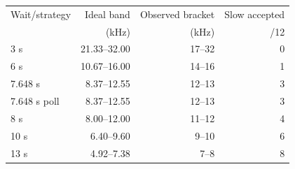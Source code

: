 \begin{tabular}{@{}lrrr@{}}
\toprule
Wait/strategy & Ideal band & Observed bracket & Slow accepted\\
 & (kHz) & (kHz) & /12\\
\midrule
3 s & 21.33--32.00 & 17--32 & 0 \\
6 s & 10.67--16.00 & 14--16 & 1 \\
7.648 s & 8.37--12.55 & 12--13 & 3 \\
7.648 s poll & 8.37--12.55 & 12--13 & 3 \\
8 s & 8.00--12.00 & 11--12 & 4 \\
10 s & 6.40--9.60 & 9--10 & 6 \\
13 s & 4.92--7.38 & 7--8 & 8 \\
\bottomrule
\end{tabular}
